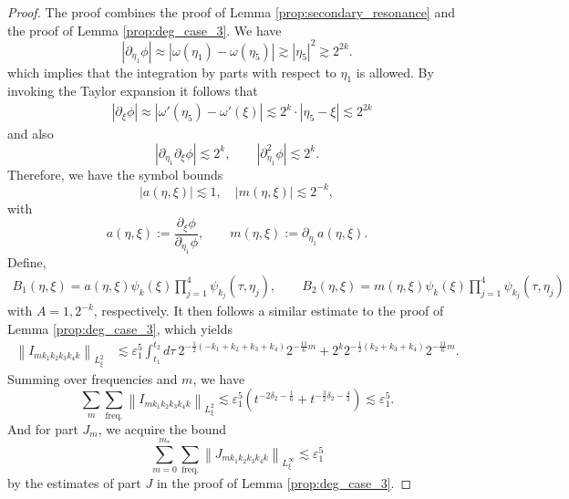 \documentclass[reqno,english,11pt]{amsart}
\newcommand{\eps}{\varepsilon}
\newcommand{\snorm}[1]{\left\|#1\right\|}
\theoremstyle{definition}
\numberwithin{equation}{section}
\begin{document}
\begin{proof}
The proof combines the proof of  Lemma \ref{prop:secondary_resonance} and the proof of Lemma \ref{prop:deg_case_3}. We have 
\begin{equation}
    \label{eq:deg_case_4_derivative_bound}
    |\partial_{\eta_{1}}\phi|\approx|\omega(\eta_1)-\omega(\eta_5)|\gtrsim |\eta_5|^2 \gtrsim 2^{2k}. 
\end{equation}
which implies that the integration by parts with respect to $\eta_1$ is allowed. By invoking the Taylor expansion it follows that
    \begin{align}
        &|\partial_\xi\phi| \approx |\omega'(\eta_5)-\omega'(\xi)|\lesssim 2^k\cdot|\eta_5-\xi|\lesssim 2^{2k}
    \end{align}
and also
\begin{equation}
    |\partial_{\eta_1}\partial_\xi \phi|\lesssim 2^k,\qquad |\partial^2_{\eta_1}\phi|\lesssim 2^k.
\end{equation}
Therefore, we have the symbol bounds
\begin{equation}
 \left|a(\eta,\xi)\right| \lesssim 1, \quad  \left| m(\eta,\xi) \right| \lesssim 2^{-k}, \label{eq:deg_case_4_a_m_bound} 
\end{equation}
with
\begin{equation}\label{eq:a_m_define_eta_1_derivative}
    a(\eta,\xi):=\frac{\partial_{\xi}\phi}{\partial_{\eta_{1}}\phi},\qquad m(\eta,\xi):=\partial_{\eta_1}a(\eta,\xi).
\end{equation}
Define,
\begin{equation*}
    \begin{aligned}
B_1 (\eta,\xi) =a(\eta,\xi) \psi_{k}(\xi)  \prod^4_{j=1}\psi_{k_{j}}\left(\tau,\eta_{j}\right),\qquad
B_2 (\eta,\xi) =m(\eta,\xi)\psi_{k}(\xi) \prod^4_{j=1}\psi_{k_{j}}\left(\tau,\eta_{j}\right)
\end{aligned}
\end{equation*}
with $A=1, 2^{-k}$, respectively. It then follows a similar estimate  to the proof of Lemma \ref{prop:deg_case_3}, which yields
\begin{equation}
    \begin{aligned}
\snorm{I_{m k_{1} k_{2} k_{3} k_{4} k}}_{L_{\xi}^{2}} &\lesssim \eps_{1}^{5} \int_{t_{1}}^{t_{2}} d \tau\ 2^{-\frac{1}{2}\left(-k_{1}+k_{2}+k_{3}+k_{4}\right)} 2^{-\frac{11}{6}m}+2^{k} 2^{-\frac{1}{2}\left(k_{2}+k_{3}+k_{4}\right)} 2^{-\frac{11}{6}m}.
\end{aligned}
\end{equation}
Summing over frequencies and $m$, we have
$$\sum_m\sum_{\operatorname{freq.}}\snorm{I_{m k_1 k_2 k_3 k_4 k}}_{L^2_\xi}\lesssim \eps_1^5\left(t^{-2\delta_2-\frac{1}{6}}+t^{-\frac{3}{2}\delta_2-\frac{4}{3}}\right)\lesssim \eps_1^5.$$
And for part $J_m$, we acquire the bound
$$\sum_{m=0}^{m_*}\sum_{\operatorname{freq.}}\snorm{J_{mk_1k_2k_3k_4k}}_{L^\infty_\xi}\lesssim \eps_1^5$$
by the estimates of part $J$ in the proof of Lemma  \ref{prop:deg_case_3}.
\end{proof}
\end{document}
